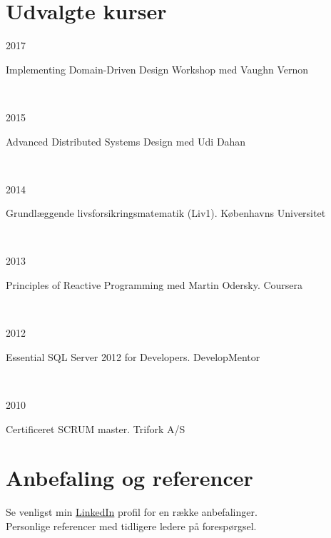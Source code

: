 \documentclass[10pt, a4paper]{article}
\begin{document}
\section{Udvalgte kurser}
\begin{Row}%
  \begin{Cell}{1}
    2017
  \end{Cell}
  \begin{Cell}{3}
    Implementing Domain-Driven Design Workshop med Vaughn Vernon
  \end{Cell}
\end{Row}
\\[0.5cm]\begin{Row}%
  \begin{Cell}{1}
    2015
  \end{Cell}
  \begin{Cell}{3}
    Advanced Distributed Systems Design med Udi Dahan
  \end{Cell}
\end{Row}
\\[0.5cm]
\begin{Row}%
  \begin{Cell}{1}
    2014
  \end{Cell}
  \begin{Cell}{3}
    Grundlæggende livsforsikringsmatematik (Liv1). Københavns Universitet
  \end{Cell}
\end{Row}
\\[0.5cm]
\begin{Row}%
  \begin{Cell}{1}
    2013
  \end{Cell}
  \begin{Cell}{3}
    Principles of Reactive Programming med Martin Odersky. Coursera
  \end{Cell}
\end{Row}
\\[0.5cm]
\begin{Row}%
  \begin{Cell}{1}
    2012
  \end{Cell}
  \begin{Cell}{3}
    Essential SQL Server 2012 for Developers. DevelopMentor
  \end{Cell}
\end{Row}
\\[0.5cm]
\begin{Row}%
  \begin{Cell}{1}
    2010
  \end{Cell}
  \begin{Cell}{3}
    Certificeret SCRUM master. Trifork A/S
  \end{Cell}
\end{Row}

\section{Anbefaling og referencer}
Se venligst min \href{https://dk.linkedin.com/in/carstenjoergensen}{LinkedIn}
profil for en række anbefalinger.
\\[0.25cm]
Personlige referencer med tidligere ledere på forespørgsel.
\end{document}
